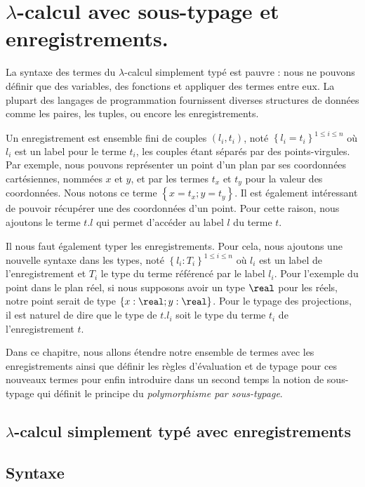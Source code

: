 \chapter{$\lambda$-calcul avec sous-typage et enregistrements.}
\label{chapter:lambda-calculus-with-records}

La syntaxe des termes du $\lambda$-calcul simplement typé est pauvre : nous ne pouvons définir que des
variables, des fonctions et appliquer des termes entre eux.
La plupart des langages de programmation fournissent diverses structures de
données comme les paires, les tuples, ou encore les enregistrements.

Un enregistrement est ensemble fini de couples $(l_{i}, t_{i})$, noté $\left\{
  l_{i} = t_{i} \right\}^{1 \leq i \leq n}$ où $l_{i}$ est
un label pour le terme $t_{i}$, les couples étant séparés par des
points-virgules. Par exemple, nous pouvons représenter un point d'un plan par
ses coordonnées cartésiennes, nommées $x$ et $y$, et par les termes $t_{x}$ et
$t_{y}$ pour la valeur des coordonnées. Nous notons ce terme $\left\{ x = t_{x}
; y = t_{y} \right\}$. Il est également intéressant de pouvoir récupérer une des
coordonnées d'un point. Pour cette raison, nous ajoutons le terme $t.l$ qui permet d'accéder au label $l$ du terme $t$.

Il nous faut également typer les enregistrements. Pour cela, nous ajoutons une
nouvelle syntaxe dans les types, noté $\left\{l_{i} : T_{i}\right\}^{1 \leq i
  \leq n}$ où $l_{i}$
est un label de l'enregistrement et $T_{i}$ le type du terme référencé par le
label $l_{i}$. Pour l'exemple du point dans le plan réel, si nous supposons avoir un
type $\real$ pour les réels, notre point serait de type $\left\{ x : \real ; y : \real
\right\}$. Pour le typage des projections, il est naturel de dire que le type de
$t.l_{i}$ soit le type du terme $t_{i}$ de l'enregistrement $t$.

Dans ce chapitre, nous allons étendre notre ensemble de termes avec les
enregistrements ainsi que définir les règles d'évaluation et de typage pour ces
nouveaux termes pour enfin introduire dans un second temps la notion de
sous-typage qui définit le principe du \textit{polymorphisme par sous-typage}.

\section{$\lambda$-calcul simplement typé avec enregistrements}

\section*{Syntaxe}


